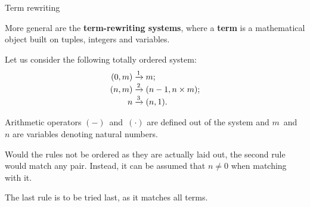%
\begin{frame}{Term rewriting}

  More general are the \textbf{term\hyp{}rewriting systems}, where a
  \textbf{term} is a mathematical object built on tuples, integers and
  variables.

  \bigskip

   Let us consider the following totally ordered system:
   \begin{align*}
     (0,m) &\xrightarrow{1} m;\\
     (n,m) &\xrightarrow{\smash 2} (n-1, n \times m);\\
     n     &\xrightarrow{\smash 3} (n,1).
   \end{align*}

   Arithmetic operators \((-)\)~and~\((\cdot)\) are defined out of the
   system and \(m\)~and~\(n\) are variables denoting natural numbers.

   \bigskip

   Would the rules not be ordered as they are actually laid out, the
   second rule would match any pair. Instead, it can be assumed that
   \(n \neq 0\) when matching with it.

   \bigskip

   The last rule is to be tried last, as it matches all terms.

\end{frame}

